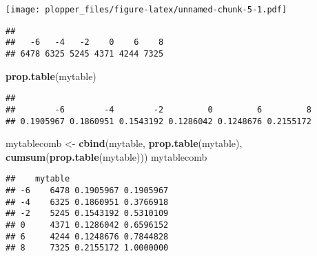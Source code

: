 \documentclass[]{article}
\newenvironment{Shaded}{\begin{snugshade}}{\end{snugshade}}
\newcommand{\KeywordTok}[1]{\textcolor[rgb]{0.13,0.29,0.53}{\textbf{#1}}}
\newcommand{\DataTypeTok}[1]{\textcolor[rgb]{0.13,0.29,0.53}{#1}}
\newcommand{\DecValTok}[1]{\textcolor[rgb]{0.00,0.00,0.81}{#1}}
\newcommand{\StringTok}[1]{\textcolor[rgb]{0.31,0.60,0.02}{#1}}
\newcommand{\OtherTok}[1]{\textcolor[rgb]{0.56,0.35,0.01}{#1}}
\newcommand{\OperatorTok}[1]{\textcolor[rgb]{0.81,0.36,0.00}{\textbf{#1}}}
\newcommand{\NormalTok}[1]{#1}
\begin{document}
\begin{Shaded}
\end{Shaded}

\texttt{[image: plopper\_files/figure-latex/unnamed-chunk-5-1.pdf]}

\begin{Shaded}
\end{Shaded}

\begin{verbatim}
## 
##   -6   -4   -2    0    6    8 
## 6478 6325 5245 4371 4244 7325
\end{verbatim}

\begin{Shaded}
\begin{Highlighting}[]
\KeywordTok{prop.table}\NormalTok{(mytable)}
\end{Highlighting}
\end{Shaded}

\begin{verbatim}
## 
##        -6        -4        -2         0         6         8 
## 0.1905967 0.1860951 0.1543192 0.1286042 0.1248676 0.2155172
\end{verbatim}

\begin{Shaded}
\begin{Highlighting}[]
\NormalTok{mytablecomb <-}\StringTok{ }\KeywordTok{cbind}\NormalTok{(mytable, }\KeywordTok{prop.table}\NormalTok{(mytable), }\KeywordTok{cumsum}\NormalTok{(}\KeywordTok{prop.table}\NormalTok{(mytable)))}
\NormalTok{mytablecomb}
\end{Highlighting}
\end{Shaded}

\begin{verbatim}
##    mytable                    
## -6    6478 0.1905967 0.1905967
## -4    6325 0.1860951 0.3766918
## -2    5245 0.1543192 0.5310109
## 0     4371 0.1286042 0.6596152
## 6     4244 0.1248676 0.7844828
## 8     7325 0.2155172 1.0000000
\end{verbatim}
\end{document}
